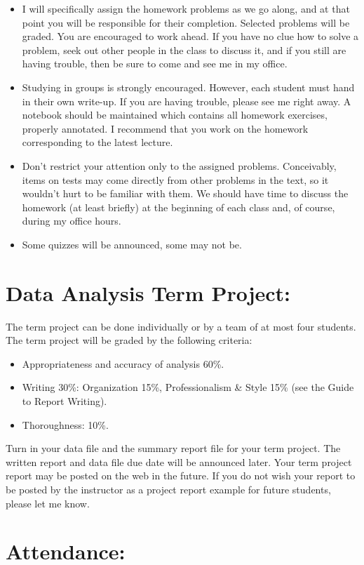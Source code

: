 \documentclass[11pt]{article}
\begin{document}
\begin{itemize}
\item I will specifically assign the homework problems as we go along, and at that point you will be responsible for their completion. Selected problems will be graded. You are encouraged to work ahead. If you have no clue how to solve a problem, seek out other people in the class to discuss it, and if you still are having trouble, then be sure to come and see me in my office.
\item Studying in groups is strongly encouraged. However, each student must hand in their own write-up. If you are having trouble, please see me right away. A notebook should be maintained which contains all homework exercises, properly annotated. I recommend that you work on the homework corresponding to the latest lecture.
\item Don't restrict your attention only to the assigned problems. Conceivably, items on tests may come directly from other problems in the text, so it wouldn't hurt to be familiar with them. We should have time to discuss the homework (at least briefly) at the beginning of each class and, of course, during my office hours.
\item Some quizzes will be announced, some may not be.
\end{itemize}
\section*{Data Analysis Term Project:}
\label{sec-6}

The term project can be done individually or by a team of at most four students. The term project will be graded by the following criteria: 
\begin{itemize}
\item Appropriateness and accuracy of analysis 60\%.
\item Writing 30\%: Organization 15\%, Professionalism \& Style 15\% (see the Guide to Report Writing).
\item Thoroughness: 10\%.
\end{itemize}
Turn in your data file and the summary report file for your term project. The written report and data file due date will be announced later. Your term project report may be posted on the web in the future. If you do not wish your report to be posted by the instructor as a project report example for future students, please let me know. 
\section*{Attendance:}
\label{sec-7}
\end{document}
